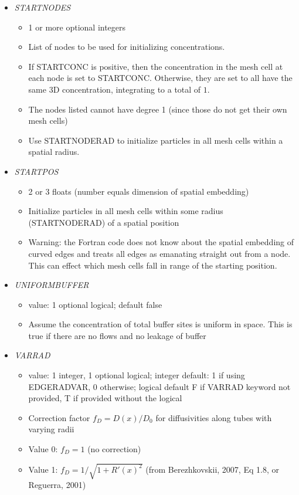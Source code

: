 \documentclass[12pt]{article}
\begin{document}
\begin{itemize}
%
\item {\it STARTNODES}
\begin{itemize}
	\item 1 or more optional integers
	\item List of nodes to be used for initializing concentrations.
	\item If STARTCONC is positive, then the concentration in the mesh cell at each node is set to STARTCONC. Otherwise, they are set to all have the same 3D concentration, integrating to a total of $1$.
	\item The nodes listed cannot have degree 1 (since those do not get their own mesh cells)
	\item Use STARTNODERAD to initialize particles in all mesh cells within a spatial radius. 
\end{itemize}
%
\item {\it STARTPOS}
\begin{itemize}
	\item 2 or 3 floats (number equals dimension of spatial embedding)
	\item Initialize particles in all mesh cells within some radius (STARTNODERAD) of a spatial position
	\item {\color{red} Warning:} the Fortran code does not know about the spatial embedding of curved edges and treats all edges as emanating straight out from a node. This can effect which mesh cells fall in range of the starting position.
\end{itemize}
%
\item {\it UNIFORMBUFFER}
\begin{itemize}
	\item  value: 1 optional logical; default false
	\item Assume the concentration of total buffer sites is uniform in space. This is true if there are no flows and  no leakage of buffer
\end{itemize}
%
\item {\it VARRAD}
\begin{itemize}
	\item value: 1 integer, 1 optional logical; integer default: 1 if using EDGERADVAR, 0 otherwise; logical default F if VARRAD keyword not provided, T if provided without the logical
	\item Correction factor $f_D = D(x)/D_0$ for diffusivities along tubes with varying radii
	\item Value 0: $f_D = 1$ (no correction)
	\item Value 1: $f_D = 1/\sqrt{1 + R'(x)^2}$ (from Berezhkovskii, 2007, Eq 1.8, or Reguerra, 2001)

\end{itemize}
\end{itemize}
\end{document}

